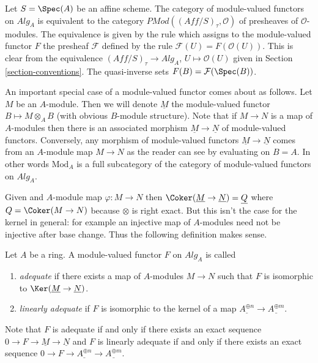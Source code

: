 \noindent
Let $S = \Spec(A)$ be an affine scheme.
The category of module-valued functors on $\textit{Alg}_A$ is
equivalent to the category
$\textit{PMod}((\textit{Aff}/S)_\tau, \mathcal{O})$
of presheaves of $\mathcal{O}$-modules. The equivalence is given
by the rule which assigns to the module-valued functor $F$ the
presheaf $\mathcal{F}$ defined by the rule
$\mathcal{F}(U) = F(\mathcal{O}(U))$.
This is clear from the equivalence
$(\textit{Aff}/S)_\tau \to \textit{Alg}_A$, $U \mapsto \mathcal{O}(U)$
given in Section \ref{section-conventions}.
The quasi-inverse sets $F(B) = \mathcal{F}(\Spec(B))$.

\medskip\noindent
An important special case of a module-valued functor comes about as follows.
Let $M$ be an $A$-module. Then we will denote $\underline{M}$ the
module-valued functor $B \mapsto M \otimes_A B$ (with obvious $B$-module
structure). Note that if $M \to N$ is a map of $A$-modules then there is an
associated morphism $\underline{M} \to \underline{N}$ of module-valued
functors. Conversely, any morphism of module-valued functors
$\underline{M} \to \underline{N}$ comes from an $A$-module map $M \to N$
as the reader can see by evaluating on $B = A$. In other words
$\text{Mod}_A$ is a full
subcategory of the category of module-valued functors on $\textit{Alg}_A$.

\medskip\noindent
Given and $A$-module map $\varphi : M \to N$ then
$\Coker(\underline{M} \to \underline{N}) =
\underline{Q}$ where $Q = \Coker(M \to N)$ because $\otimes$
is right exact. But this isn't the case
for the kernel in general: for example an injective map of
$A$-modules need not be injective after base change. Thus the following
definition makes sense.

\begin{definition}
\label{definition-adequate-functor}
Let $A$ be a ring. A module-valued functor $F$ on $\textit{Alg}_A$ is
called
\begin{enumerate}
\item {\it adequate} if there exists a
map of $A$-modules $M \to N$ such that $F$ is isomorphic to
$\Ker(\underline{M} \to \underline{N})$.
\item {\it linearly adequate} if $F$ is isomorphic to the
kernel of a map $\underline{A^{\oplus n}} \to \underline{A^{\oplus m}}$.
\end{enumerate}
\end{definition}

\noindent
Note that $F$ is adequate if and only if there exists an
exact sequence $0 \to F \to \underline{M} \to \underline{N}$ and
$F$ is linearly adequate if and only if there exists an exact sequence
$0 \to F \to \underline{A^{\oplus n}} \to \underline{A^{\oplus m}}$.


